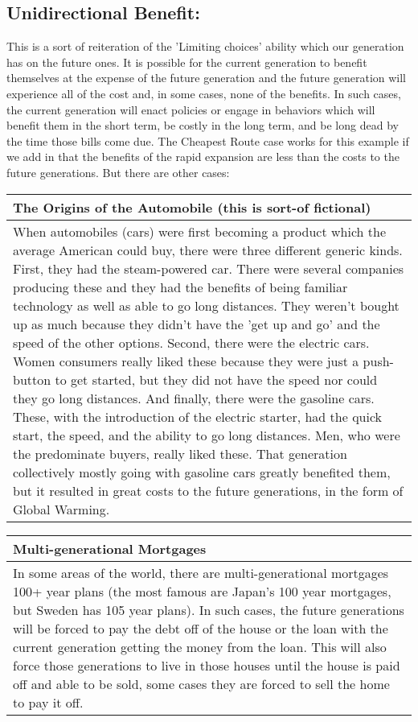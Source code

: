 \subsection{Unidirectional Benefit:}

This is a sort of reiteration of the 'Limiting choices' ability which our generation has on the future ones. It is possible for the current generation to benefit themselves at the expense of the future generation and the future generation will experience all of the cost and, in some cases, none of the benefits. In such cases, the current generation will enact policies or engage in behaviors which will benefit them in the short term, be costly in the long term, and be long dead by the time those bills come due.  The Cheapest Route case works for this example if we add in that the benefits of the rapid expansion are less than the costs to the future generations. But there are other cases:
\noindent
\begin{tabular}{p{5.5in}}
The Origins of the Automobile (this is sort-of fictional)\\\hline
When automobiles (cars) were first becoming a product which the average American could buy, there were three different generic kinds. First, they had the steam-powered car. There were several companies producing these and they had the benefits of being familiar technology as well as able to go long distances. They weren't bought up as much because they didn't have the 'get up and go' and the speed of the other options. Second, there were the electric cars. Women consumers really liked these because they were just a push-button to get started, but they did not have the speed nor could they go long distances. And finally, there were the gasoline cars. These, with the introduction of the electric starter, had the quick start, the speed, and the ability to go long distances. Men, who were the predominate buyers, really liked these. That generation collectively mostly going with gasoline cars greatly benefited them,  but it resulted in great costs to the future generations, in the form of Global Warming.  \\
\end{tabular}
\noindent
\begin{tabular}{p{5.5in}}
Multi-generational Mortgages\\\hline
In some areas of the world, there are multi-generational mortgages 100+ year plans (the most famous are Japan’s 100 year mortgages, but Sweden has 105 year plans). In such cases, the future generations will be forced to pay the debt off of the house or the loan with the current generation getting the money from the loan. This will also force those generations to live in those houses until the house is paid off and able to be sold, some cases they are forced to sell the home to pay it off.
\end{tabular}

